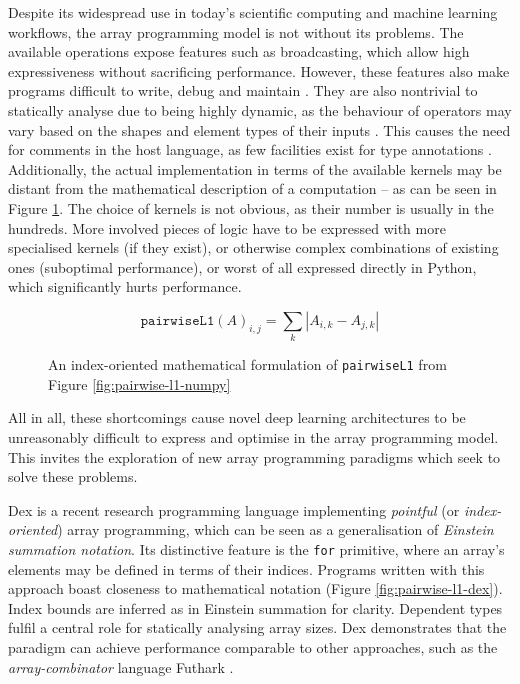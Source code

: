 Despite its widespread use in today's scientific computing and machine learning workflows, the array programming model is not without its problems. The available operations expose features such as broadcasting, which allow high expressiveness without sacrificing performance. However, these features also make programs difficult to write, debug and maintain \cite{paszke2021getting}. They are also nontrivial to statically analyse due to being highly dynamic, as the behaviour of operators may vary based on the shapes and element types of their inputs \cite{liu2020type}. This causes the need for comments in the host language, as few facilities exist for type annotations . Additionally, the actual implementation in terms of the available kernels may be distant from the mathematical description of a computation -- as can be seen in Figure \ref{fig:pairwise-l1-math}. The choice of kernels is not obvious, as their number is usually in the hundreds. More involved pieces of logic have to be expressed with more specialised kernels (if they exist), or otherwise complex  combinations of existing ones (suboptimal performance), or worst of all expressed directly in Python, which significantly hurts performance.

\begin{figure}[h]
    \centering
    $$ \texttt{pairwiseL1}(A)_{i,j} = \sum_{k} \left| A_{i,k} - A_{j,k} \right|  $$
    \caption{An index-oriented mathematical formulation of \texttt{pairwiseL1} from Figure \ref{fig:pairwise-l1-numpy}}
    \label{fig:pairwise-l1-math}
\end{figure}

All in all, these shortcomings cause novel deep learning architectures to be unreasonably difficult to express and optimise in the array programming model. This invites the exploration of new array programming paradigms which seek to solve these problems.

Dex \cite{paszke2021getting} is a recent research programming language implementing \textit{pointful} (or \textit{index-oriented}) array programming, which can be seen as a generalisation of \textit{Einstein summation notation}. Its distinctive feature is the \texttt{for} primitive, where an array's elements may be defined in terms of their indices. Programs written with this approach boast closeness to mathematical notation (Figure \ref{fig:pairwise-l1-dex}). Index bounds are inferred as in Einstein summation for clarity. Dependent types fulfil a central role for statically analysing array sizes. Dex demonstrates that the paradigm can achieve performance comparable to other approaches, such as the \textit{array-combinator} language Futhark \cite{henriksen2017futhark}.

